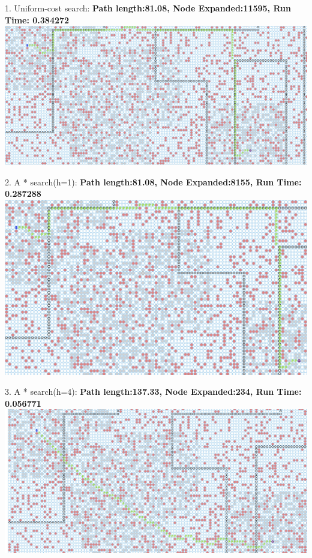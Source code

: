 \documentclass[12pt, letterpaper]{article}
\begin{document}
1. Uniform-cost search:\newline
\medskip
\textbf{Path length:81.08, Node Expanded:11595,	Run Time: 0.384272}\newline
\noindent \includegraphics[scale=0.2]{"b-map5-1-u"}\newline

2. A * search(h=1): \newline
\medskip
\textbf{Path length:81.08, Node Expanded:8155,	Run Time: 0.287288}\newline
\noindent \includegraphics[scale=0.2]{"b-map5-1-a-real"}\newline

3. A * search(h=4): \newline
\medskip
\textbf{Path length:137.33, Node Expanded:234,	Run Time: 0.056771}\newline
\noindent \includegraphics[scale=0.2]{"b-map5-1-a"}\newline
\end{document}
